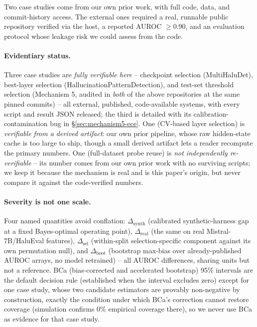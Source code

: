 \documentclass{article}
\begin{document}
Two case studies come from our own prior work, with full code, data, and
commit-history access. The external ones required a real, runnable public
repository verified via the host, a reported AUROC $\geq 0.90$, and an
evaluation protocol whose leakage risk we could assess from the code.

\paragraph{Evidentiary status.} Three case studies are \emph{fully verifiable
here} -- checkpoint selection (MultiHaluDet), best-layer selection
(HallucinationPatternDetection), and test-set threshold selection
(Mechanism 5, audited in \emph{both} of the above repositories at the same
pinned commits) -- all external, published, code-available systems,
with every script and result JSON released; the third is detailed with its
calibration-contamination bug in \S\ref{sec:mechanism5-ece}. One (CV-based
layer selection) is \emph{verifiable from a derived artifact}: our own prior
pipeline, whose raw hidden-state cache is too large to ship, though a small
derived artifact lets a reader recompute the primary numbers. One
(full-dataset probe reuse) is \emph{not independently re-verifiable} -- its
number comes from our own prior work with no surviving scripts; we keep it
because the mechanism is real and is this paper's origin, but never compare it
against the code-verified numbers.

\paragraph{Severity is not one scale.} Four named quantities avoid
conflation: $\Delta_{\text{synth}}$ (calibrated synthetic-harness gap at a
fixed Bayes-optimal operating point), $\Delta_{\text{real}}$ (the same on
real Mistral-7B/HaluEval features), $\Delta_{\text{sel}}$ (within-split
selection-specific component against its own permutation null), and
$\Delta_{\text{boot}}$ (bootstrap max-bias over already-published AUROC
arrays, no model retrained) -- all AUROC differences, sharing units but not
a reference. BCa (bias-corrected and accelerated bootstrap) 95\% intervals
are the default decision rule (established
when the interval excludes zero) except for one case study, whose two
candidate estimators are provably non-negative by construction, exactly the
condition under which BCa's correction cannot restore coverage (simulation
confirms $0\%$ empirical coverage there), so we never use BCa as evidence
for that case study.
\end{document}
